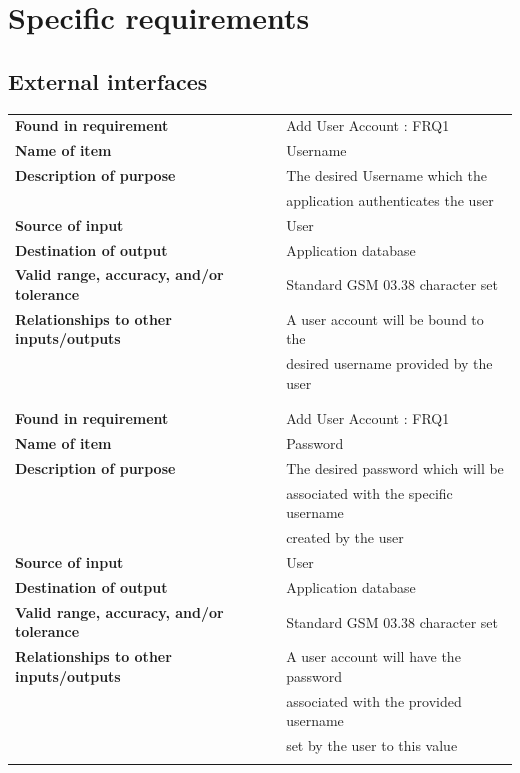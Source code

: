 \section{Specific requirements}

\subsection{External interfaces}
\begin{tabular}{ll}
\textbf{Found in requirement}&Add User Account : FRQ1\\
\textbf{Name of item}&Username\\
\textbf{Description of purpose}&The desired Username which the \\&application authenticates the user\\
\textbf{Source of input}&User\\
\textbf{Destination of output}&Application database\\
\textbf{Valid range, accuracy, and/or tolerance}&Standard GSM 03.38 character set\\
\textbf{Relationships to other inputs/outputs}&A user account will be bound to the\\& desired username provided by the user\\
&\\
&\\
\textbf{Found in requirement}&Add User Account : FRQ1\\
\textbf{Name of item}&Password\\
\textbf{Description of purpose}&The desired password which will be \\&associated with the specific username \\& created by the user\\
\textbf{Source of input}&User\\
\textbf{Destination of output}&Application database\\
\textbf{Valid range, accuracy, and/or tolerance}&Standard GSM 03.38 character set\\
\textbf{Relationships to other inputs/outputs}&A user account will have the password\\& associated with the provided username\\& set by the user to this value\\
&\\

\end{tabular}
